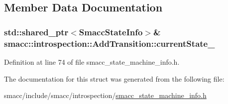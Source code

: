 \subsection{Member Data Documentation}
\subsubsection[{\texorpdfstring{current\+State\+\_\+}{currentState_}}]{\setlength{\rightskip}{0pt plus 5cm}std\+::shared\+\_\+ptr$<${\bf Smacc\+State\+Info}$>$\& smacc\+::introspection\+::\+Add\+Transition\+::current\+State\+\_\+}\hypertarget{structsmacc_1_1introspection_1_1AddTransition_a56fd9b1bdf6761bbe5258dc915481f4b}{}\label{structsmacc_1_1introspection_1_1AddTransition_a56fd9b1bdf6761bbe5258dc915481f4b}


Definition at line 74 of file smacc\+\_\+state\+\_\+machine\+\_\+info.\+h.



The documentation for this struct was generated from the following file\+:\begin{DoxyCompactItemize}
\item 
smacc/include/smacc/introspection/\hyperlink{smacc__state__machine__info_8h}{smacc\+\_\+state\+\_\+machine\+\_\+info.\+h}\end{DoxyCompactItemize}
